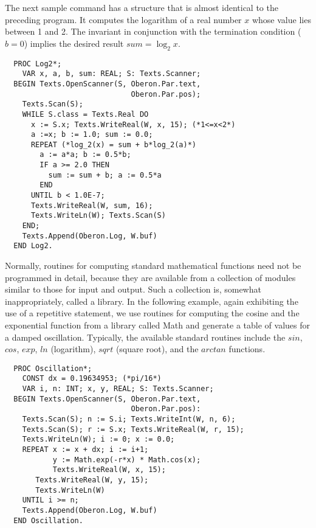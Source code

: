 The next sample command has a structure that is almost identical to the preceding program. It
computes the logarithm of a real number $x$ whose value lies between 1 and 2. The invariant in
conjunction with the termination condition ($b=0$) implies the desired result $sum=\log_2{x}$.
\begin{verbatim}
  PROC Log2*;
    VAR x, a, b, sum: REAL; S: Texts.Scanner;
  BEGIN Texts.OpenScanner(S, Oberon.Par.text,
                             Oberon.Par.pos);
    Texts.Scan(S);
    WHILE S.class = Texts.Real DO
      x := S.x; Texts.WriteReal(W, x, 15); (*1<=x<2*)
      a :=x; b := 1.0; sum := 0.0;
      REPEAT (*log_2(x) = sum + b*log_2(a)*)
        a := a*a; b := 0.5*b;
        IF a >= 2.0 THEN
          sum := sum + b; a := 0.5*a
        END
      UNTIL b < 1.0E-7;
      Texts.WriteReal(W, sum, 16);
      Texts.WriteLn(W); Texts.Scan(S)
    END;
    Texts.Append(Oberon.Log, W.buf)
  END Log2.
\end{verbatim}

Normally, routines for computing standard mathematical functions need not be programmed in
detail, because they are available from a collection of modules similar to those for input
and output. Such a collection is, somewhat inappropriately, called a library. In the following
example, again exhibiting the use of a repetitive statement, we use routines for computing the
cosine and the exponential function from a library called Math and generate a table of values
for a damped oscillation. Typically, the available standard routines include the $sin$, $cos$,
$exp$, $ln$ (logarithm), $sqrt$ (square root), and the $arctan$ functions.
\begin{verbatim}
  PROC Oscillation*;
    CONST dx = 0.19634953; (*pi/16*)
    VAR i, n: INT; x, y, REAL; S: Texts.Scanner;
  BEGIN Texts.OpenScanner(S, Oberon.Par.text,
                             Oberon.Par.pos):
    Texts.Scan(S); n := S.i; Texts.WriteInt(W, n, 6);
    Texts.Scan(S); r := S.x; Texts.WriteReal(W, r, 15);
    Texts.WriteLn(W); i := 0; x := 0.0;
    REPEAT x := x + dx; i := i+1;
           y := Math.exp(-r*x) * Math.cos(x);
           Texts.WriteReal(W, x, 15);
	   Texts.WriteReal(W, y, 15);
	   Texts.WriteLn(W)
    UNTIL i >= n;
    Texts.Append(Oberon.Log, W.buf)
  END Oscillation.
\end{verbatim}
